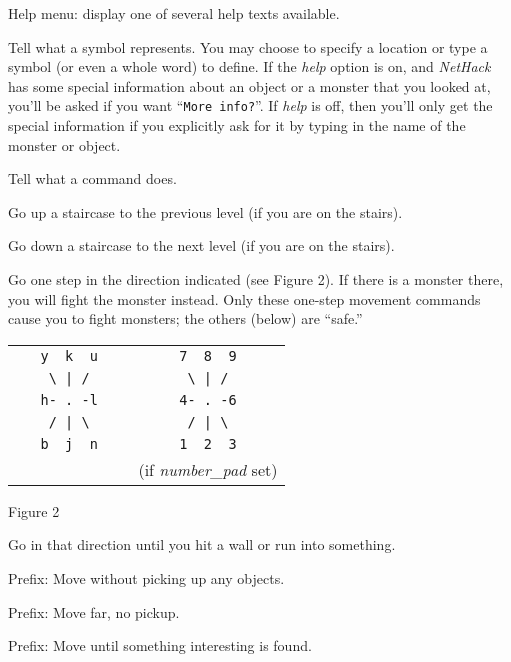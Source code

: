 \blist{}
\item[\tb{?}]
Help menu:  display one of several help texts available.
\item[\tb{/}]
Tell what a symbol represents.  You may choose to specify a location
or type a symbol (or even a whole word) to define.  If the {\it help\/}
option is on, and {\it NetHack\/} has some special information about an object
or a monster that you looked at, you'll be asked if you want ``{\tt More
info?}''.
If {\it help\/} is off, then you'll only get the special information if you
explicitly ask for it by typing in the name of the monster or object.
\item[\tb{\&}]
Tell what a command does.
\item[\tb{<}]
Go up a staircase to the previous level (if you are on the stairs).
\item[\tb{>}]
Go down a staircase to the next level (if you are on the stairs).
\item[\tb{[yuhjklbn]}]
Go one step in the direction indicated (see Figure 2).  If there is
a monster there, you will fight the monster instead.  Only these
one-step movement commands cause you to fight monsters; the others
(below) are ``safe.''
\begin{center}
\begin{tabular}{cc}
\verb+   y  k  u   + & \verb+   7  8  9   +\\
\verb+    \ | /    + & \verb+    \ | /    +\\
\verb+   h- . -l   + & \verb+   4- . -6   +\\
\verb+    / | \    + & \verb+    / | \    +\\
\verb+   b  j  n   + & \verb+   1  2  3   +\\
                     & (if {\it number\_pad\/} set)
\end{tabular}
\end{center}
\begin{center}
Figure 2
\end{center}
\item[\tb{[YUHJKLBN]}]
Go in that direction until you hit a wall or run into something.
\item[\tb{m[yuhjklbn]}]
Prefix:  Move without picking up any objects.
\item[\tb{M[yuhjklbn]}]
Prefix:  Move far, no pickup.
\item[\tb{g[yuhjklbn]}]
Prefix:  Move until something interesting is found.
\item[\tb{G[yuhjklbn] or <CONTROL->[yuhjklbn]}]
